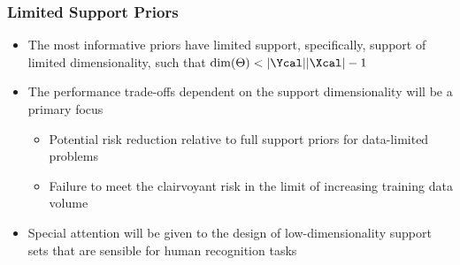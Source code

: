 \documentclass[aspectratio=169,usenames,dvipsnames]{beamer}
\begin{document}
\begin{frame}
\frametitle{Limited Support Priors}

\begin{itemize}
\item The most informative priors have limited support, specifically, support of \alert{limited dimensionality}, such that $\dim(\Theta) < |\Ycal||\Xcal| - 1$
\vspace{0.5em}
\item The performance trade-offs dependent on the support dimensionality will be a primary focus
	\vspace{0.25em}
	\begin{itemize}
	\item Potential risk reduction relative to full support priors for data-limited problems
	\vspace{0.25em}
	\item Failure to meet the clairvoyant risk in the limit of increasing training data volume
	\end{itemize}
\vspace{0.5em}
\item Special attention will be given to the design of low-dimensionality support sets that are sensible for human recognition tasks
\end{itemize}

\vspace{1em}
\centering
{}

\end{frame}
\end{document}
